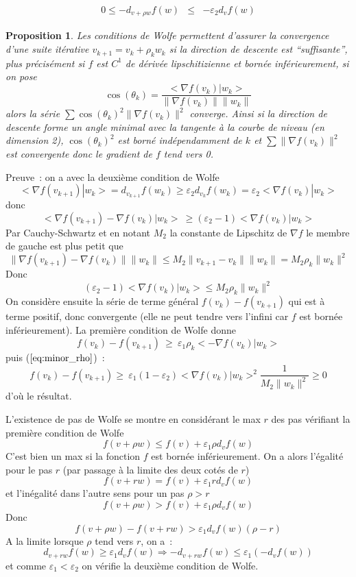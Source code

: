 \documentclass[a4paper,11pt]{book}
\newtheorem{prop}[thm]{Proposition}
\begin{document}
\begin{giacjshere}
\begin{itemize}
\begin{eqnarray*}
0 \leq -d_{v+\rho w}f(w) &\leq& -\varepsilon_2 d_vf(w)
\end{eqnarray*}
\end{itemize}
\begin{prop}
Les conditions de Wolfe permettent d'assurer la convergence d'une
suite it\'erative $v_{k+1}=v_k+\rho_k w_k$ si la direction de descente
est ``suffisante'', plus pr\'ecis\'ement si $f$ est $C^1$ de d\'eriv\'ee
lipschitizienne et born\'ee inf\'erieurement, si on pose
$$ \cos(\theta_k)=\frac{<\nabla f(v_k)|w_k>}{\| \nabla f(v_k)\| \|w_k\|}$$
alors la s\'erie
$ \sum \cos(\theta_k)^2 \| \nabla f(v_k)\|^2 $ converge.
Ainsi si la direction de descente forme un angle minimal avec la
tangente \`a la courbe de niveau (en dimension 2), $\cos(\theta_k)^2$
est born\'e ind\'ependamment de $k$ et $\sum \|  \nabla f(v_k)\|^2$
est convergente donc le gradient de $f$ tend vers 0.
\end{prop}
Preuve~: on a avec la deuxi\`eme condition de Wolfe
$$ <\nabla f(v_{k+1})|w_k>=d_{v_{k+1}}f(w_k) 
\geq \varepsilon_2 d_{v_k}f(w_k)= \varepsilon_2<\nabla f(v_k)|w_k>$$
donc
$$ <\nabla f(v_{k+1})-\nabla f(v_k)|w_k> \ \geq (\varepsilon_2-1) <\nabla f(v_k)|w_k>$$
Par Cauchy-Schwartz et en notant $M_2$ la constante de Lipschitz de $\nabla f$
le membre de gauche est plus petit que 
$$ \| \nabla f(v_{k+1})-\nabla f(v_k) \| \| w_k \| \leq 
M_2\|v_{k+1}-v_k\| \| w_k\| = M_2 \rho_k \| w_k \|^2$$
Donc
\begin{equation} \label{eq:minor_rho}
 (\varepsilon_2-1)<\nabla f(v_k)|w_k> \leq M_2 \rho_k \| w_k \|^2
\end{equation}
On consid\`ere ensuite la s\'erie de terme g\'en\'eral
$f(v_{k})-f(v_{k+1})$  qui est \`a terme positif, donc convergente
(elle ne peut tendre vers l'infini car $f$ est born\'ee
inf\'erieurement).
La premi\`ere condition de Wolfe donne
$$ f(v_{k})-f(v_{k+1})  \ \geq  \ \varepsilon_1 \rho_k <-\nabla
f(v_k)|w_k> $$
puis (\(\ref{eq:minor_rho}\))~:
$$ f(v_{k})-f(v_{k+1})  \geq \ 
\varepsilon_1  (1-\varepsilon_2)<\nabla f(v_k)|w_k>^2\frac{1}{M_2  \|  w_k \|^2} 
 \geq 0 $$
d'o\`u le r\'esultat.

L'existence de pas de Wolfe se montre en consid\'erant le max $r$ des
pas v\'erifiant la premi\`ere condition de Wolfe
$$f(v+\rho w) \leq f(v) +\varepsilon_1 \rho d_vf(w) $$
C'est bien un max si la fonction
$f$ est born\'ee inf\'erieurement. On a alors l'\'egalit\'e pour le pas
$r$ (par passage \`a la limite des deux cot\'es de $r$)
$$f(v+r w) = f(v) +\varepsilon_1 r d_vf(w) $$
et l'in\'egalit\'e dans l'autre sens pour un pas $\rho>r$
$$f(v+\rho w) > f(v) +\varepsilon_1 \rho d_vf(w) $$
Donc
$$ f(v+\rho w)-f(v+r w) > \varepsilon_1 d_vf(w) (\rho -r)$$
A la limite lorsque $\rho$ tend vers $r$, on a~:
$$ d_{v+rw}f(w) \geq \varepsilon_1 d_vf(w) \Rightarrow -d_{v+rw}f(w) \leq \varepsilon_1 (-d_vf(w))$$
et comme $\varepsilon_1<\varepsilon_2$ on v\'erifie la deuxi\`eme
condition de Wolfe.


\end{giacjshere}
\end{document}
